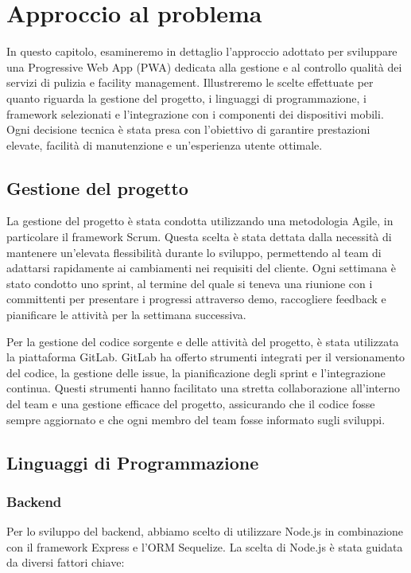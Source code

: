 \documentclass[twoside]{supsistudent}
\begin{document}
\chapter{Approccio al problema}
In questo capitolo, esamineremo in dettaglio l'approccio adottato per sviluppare una Progressive Web App (PWA) dedicata alla gestione e al controllo qualità dei servizi di pulizia e facility management. Illustreremo le scelte effettuate per quanto riguarda la gestione del progetto, i linguaggi di programmazione, i framework selezionati e l'integrazione con i componenti dei dispositivi mobili. Ogni decisione tecnica è stata presa con l'obiettivo di garantire prestazioni elevate, facilità di manutenzione e un'esperienza utente ottimale.

\section{Gestione del progetto}

La gestione del progetto è stata condotta utilizzando una metodologia Agile, in particolare il framework Scrum. Questa scelta è stata dettata dalla necessità di mantenere un'elevata flessibilità durante lo sviluppo, permettendo al team di adattarsi rapidamente ai cambiamenti nei requisiti del cliente. Ogni settimana è stato condotto uno sprint, al termine del quale si teneva una riunione con i committenti per presentare i progressi attraverso demo, raccogliere feedback e pianificare le attività per la settimana successiva.

Per la gestione del codice sorgente e delle attività del progetto, è stata utilizzata la piattaforma GitLab. GitLab ha offerto strumenti integrati per il versionamento del codice, la gestione delle issue, la pianificazione degli sprint e l'integrazione continua. Questi strumenti hanno facilitato una stretta collaborazione all'interno del team e una gestione efficace del progetto, assicurando che il codice fosse sempre aggiornato e che ogni membro del team fosse informato sugli sviluppi.

\section{Linguaggi di Programmazione}

\subsection{Backend}

Per lo sviluppo del backend, abbiamo scelto di utilizzare Node.js in combinazione con il framework Express e l'ORM Sequelize. La scelta di Node.js è stata guidata da diversi fattori chiave:
\end{document}
